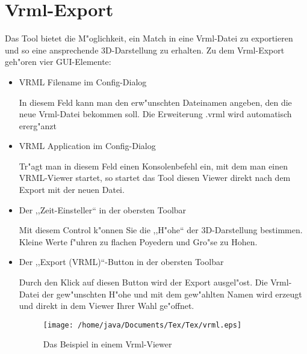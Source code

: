\documentclass[a4paper,10pt,twoside]{scrreprt}
\begin{document}
\section{Vrml-Export}
Das Tool bietet die M"oglichkeit, ein Match in eine Vrml-Datei zu exportieren und so eine ansprechende 3D-Darstellung zu erhalten. Zu dem Vrml-Export geh"oren vier GUI-Elemente:
\begin{itemize}
\item VRML Filename im Config-Dialog

 In diesem Feld kann man den erw"unschten Dateinamen angeben, den die neue Vrml-Datei bekommen soll. Die Erweiterung .vrml wird automatisch ererg"anzt
\item VRML Application im Config-Dialog

Tr"agt man in diesem Feld einen Konsolenbefehl ein, mit dem man einen VRML-Viewer startet, so startet das Tool diesen Viewer direkt nach dem Export mit der neuen Datei.

\item Der ,,Zeit-Einsteller`` in der obersten Toolbar

Mit diesem Control k"onnen Sie die ,,H"ohe`` der 3D-Darstellung bestimmen. Kleine Werte f"uhren zu flachen Poyedern und Gro"se zu Hohen.
\item Der ,,Export (VRML)``-Button in der obersten Toolbar

Durch den Klick auf diesen Button wird der Export ausgel"ost. Die Vrml-Datei der gew"unschten H"ohe und mit dem gew"ahlten Namen wird erzeugt und direkt in dem Viewer Ihrer Wahl ge"offnet.
\begin{figure}
   \centering
   \texttt{[image: /home/java/Documents/Tex/Tex/vrml.eps]}
   \caption{Das Beispiel in einem Vrml-Viewer}
   \label{fig:vrml}
\end{figure}
\end{itemize}
\end{document}
